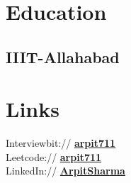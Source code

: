 \documentclass[]{deedy-resume-openfont}
\begin{document}
%
%
    \lastupdated

%
%

%
%

    \begin{minipage}[t]{0.33\textwidth}


        \section{Education}

        \subsection{IIIT-Allahabad}
        \sectionsep




        \section{Links}
        Interviewbit:// \href{https://www.interviewbit.com/profile/arpit711}{\bf arpit711} \\
        Leetcode:// \href{https://leetcode.com/arpit711/}{\bf arpit711} \\
        LinkedIn://  \href{http://linkedin.com/in/arpit-sharma-3aba1097}{\bf ArpitSharma} \\


\end{minipage}
\end{document}
